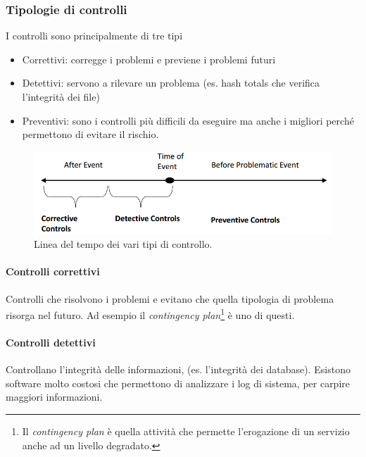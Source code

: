 \subsubsection{Tipologie di controlli}

I controlli sono principalmente di tre tipi
\begin{itemize}
\item Correttivi: corregge i problemi e previene i problemi futuri
\item Detettivi: servono a rilevare un problema (es. hash totals che 
verifica l'integrità dei file)
\item Preventivi: sono i controlli più difficili da eseguire ma anche 
i migliori perché permettono di evitare il rischio.
\end{itemize}

\begin{figure}[H]
	\begin{center}	
\includegraphics[scale=0.3]{res/img/control_timeline.png}
	\end{center}
	\caption{Linea del tempo dei vari tipi di controllo.}
\end{figure}

\paragraph*{Controlli correttivi} Controlli che risolvono i problemi e 
evitano che quella tipologia di problema risorga nel futuro. Ad esempio il 
\textit{contingency plan}\footnote{Il \textit{contingency plan} è quella 
attività che permette l'erogazione di un servizio anche ad un livello 
degradato.} è uno di questi.

\paragraph*{Controlli detettivi} Controllano l'integrità delle 
informazioni, (es. l'integrità dei database). Esistono software 
molto costosi che permettono di analizzare i log di sistema, per carpire 
maggiori informazioni.

